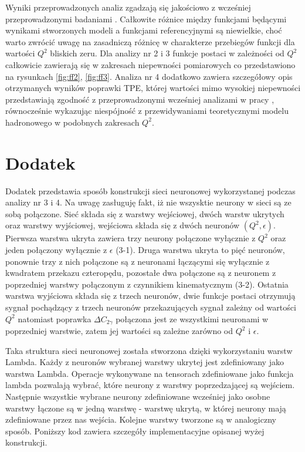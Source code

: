 \documentclass[11pt]{book}
\theoremstyle{definition}
\begin{document}
Wyniki przeprowadzonych analiz zgadzają się jakościowo z wcześniej przeprowadzonymi badaniami \cite{2009PhRvC..79f5204A}. Całkowite różnice między funkcjami będącymi wynikami stworzonych modeli a funkcjami referencyjnymi są niewielkie, choć warto zwrócić uwagę na zasadniczą różnicę w charakterze przebiegów funkcji dla wartości $Q^2$ bliskich zeru. Dla analizy nr 2 i 3 funkcje postaci w zależności od $Q^2$ całkowicie zawierają się w zakresach niepewności pomiarowych co przedstawiono na rysunkach \ref{fig:ff2}, \ref{fig:ff3}. Analiza nr 4 dodatkowo zawiera szczegółowy opis otrzymanych wyników poprawki TPE, której wartości mimo wysokiej niepewności przedstawiają zgodność z przeprowadzonymi wcześniej analizami w pracy \cite{2013PhRvC..88f5205G}, równocześnie wykazując niespójność z przewidywaniami teoretycznymi modelu hadronowego w podobnych zakresach $Q^2$.






\clearpage

\appendix
\setcounter{secnumdepth}{-1}
\chapter{Dodatek}
%
Dodatek przedstawia sposób konstrukcji sieci neuronowej wykorzystanej podczas analizy nr 3 i 4. Na uwagę zasługuję fakt, iż nie wszysktie neurony w sieci są ze sobą połączone. Sieć składa się z warstwy wejściowej, dwóch warstw ukrytych oraz warstwy wyjściowej, wejściowa składa się z dwóch neuronów $(Q^2, \epsilon)$. Pierwsza warstwa ukryta zawiera trzy neurony połączone wyłącznie z $Q^2$ oraz jeden połączony wyłącznie z $\epsilon$ (3-1). Druga warstwa ukryta to pięć neuronów, ponownie trzy z nich połączone są z neuronami łączącymi się wyłącznie z kwadratem przekazu czteropędu, pozostałe dwa połączone są z neuronem z poprzedniej warstwy połączonym z czynnikiem kinematycznym (3-2). Ostatnia warstwa wyjściowa składa się z trzech neuronów, dwie funkcje postaci otrzymują sygnał pochądzący z trzech neuronów przekazujących sygnał zależny od wartości $Q^2$ natomiast poprawka $\Delta C_{2\gamma}$ połączona jest ze wszystkimi neuronami w poprzedniej warstwie, zatem jej wartości są zależne zarówno od $Q^2$ i $\epsilon$. 

Taka struktura sieci neuronowej została stworzona dzięki wykorzystaniu warstw Lambda. Każdy z neuronów wybranej warstwy ukrytej jest zdefiniowany jako warstwa Lambda. Operacje wykonywane na tensorach zdefiniowane jako funkcja lambda pozwalają wybrać, które neurony z warstwy poprzedzającej są wejściem. Następnie wszystkie wybrane neurony zdefiniowane wcześniej jako osobne warstwy łączone są w jedną warstwę - warstwę ukrytą, w której neurony mają zdefiniowane przez nas wejścia. Kolejne warstwy tworzone są w analogiczny sposób. Poniższy kod zawiera szczegóły implementacyjne opisanej wyżej konstrukcji.
\end{document}
